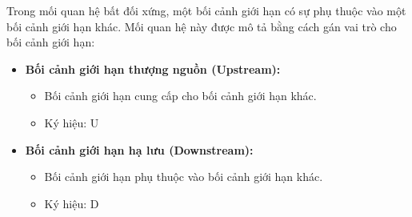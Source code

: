 Trong mối quan hệ bất đối xứng, một bối cảnh giới hạn có sự phụ thuộc vào một bối cảnh giới hạn khác. Mối quan hệ này được mô tả bằng cách gán vai trò cho bối cảnh giới hạn:

\begin{itemize}

    \item \textbf{Bối cảnh giới hạn thượng nguồn (Upstream):}
          \begin{itemize}


              \item     Bối cảnh giới hạn cung cấp cho bối cảnh giới hạn khác.
              \item Ký hiệu:      U
          \end{itemize}

    \item \textbf{Bối cảnh giới hạn hạ lưu (Downstream):}
          \begin{itemize}
              \item    Bối cảnh giới hạn phụ thuộc vào bối cảnh giới hạn khác.
              \item Ký hiệu:     D
          \end{itemize}


\end{itemize}

